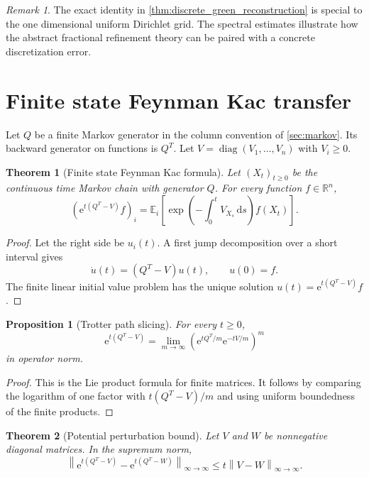 \documentclass{aomart}
\newtheorem{theorem}{Theorem}[section]
\newtheorem{proposition}[proposition]{Proposition}
\theoremstyle{definition}
\theoremstyle{remark}
\newtheorem{remark}[remark]{Remark}
\newcommand{\RR}{\mathbb R}
\newcommand{\EE}{\mathbb E}
\newcommand{\e}{\mathrm e}
\newcommand{\dd}{\,\mathrm d}
\newcommand{\diag}{\operatorname{diag}}
\newcommand{\norm}[1]{\left\lVert#1\right\rVert}
\begin{document}
\begin{remark}
The exact identity in \cref{thm:discrete_green_reconstruction} is special to the one dimensional uniform Dirichlet grid. The spectral estimates illustrate how the abstract fractional refinement theory can be paired with a concrete discretization error.
\end{remark}

\section{Finite state Feynman Kac transfer}\label{sec:feynman_kac}

Let \(Q\) be a finite Markov generator in the column convention of \cref{sec:markov}. Its backward generator on functions is \(Q^T\). Let \(V=\diag(V_1,\ldots,V_n)\) with \(V_i\geq0\).

\begin{theorem}[Finite state Feynman Kac formula]\label{thm:finite_feynman_kac}
Let \((X_t)_{t\geq0}\) be the continuous time Markov chain with generator \(Q\). For every function \(f\in\RR^n\),
\[
\boxed{
\left(\e^{t(Q^T-V)}f\right)_i
=
\EE_i\left[
\exp\left(-\int_0^tV_{X_s}\dd s\right)
f(X_t)
\right].
}
\]
\end{theorem}

\begin{proof}
Let the right side be \(u_i(t)\). A first jump decomposition over a short interval gives
\[
\dot u(t)=(Q^T-V)u(t),
\qquad
u(0)=f.
\]
The finite linear initial value problem has the unique solution \(u(t)=\e^{t(Q^T-V)}f\).
\end{proof}

\begin{proposition}[Trotter path slicing]\label{prop:trotter_path_slicing}
For every \(t\geq0\),
\[
\boxed{
\e^{t(Q^T-V)}
=
\lim_{m\to\infty}
\left(
\e^{tQ^T/m}
\e^{-tV/m}
\right)^m
}
\]
in operator norm.
\end{proposition}

\begin{proof}
This is the Lie product formula for finite matrices. It follows by comparing the logarithm of one factor with \(t(Q^T-V)/m\) and using uniform boundedness of the finite products.
\end{proof}

\begin{theorem}[Potential perturbation bound]\label{thm:feynman_kac_potential_bound}
Let \(V\) and \(W\) be nonnegative diagonal matrices. In the supremum norm,
\[
\boxed{
\norm{
\e^{t(Q^T-V)}
-
\e^{t(Q^T-W)}
}_{\infty\to\infty}
\leq
 t\norm{V-W}_{\infty\to\infty}.
}
\]
\end{theorem}
\end{document}
